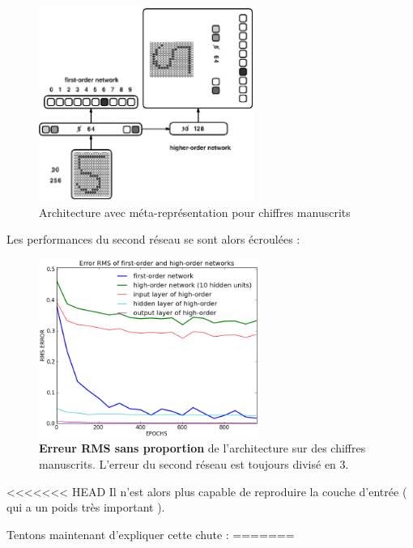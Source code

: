 \documentclass[a4paper,12pt, twoside]{article}
\begin{document}
\begin{figure}[H]
\begin{center}
 \includegraphics[height=240px]{../cleeremans_2007/digit_reco/schema_handwritten.png}
\end{center}
\caption{ Architecture avec méta-représentation pour chiffres manuscrits}
\end{figure}

Les performances du second réseau se sont alors écroulées : 
\begin{figure}[H]
\begin{center}
 \includegraphics[height=220px]{../cleeremans_2007/digit_reco/rms_handwritten_ffa.png}
\end{center}
\caption{ \textbf{Erreur RMS sans proportion} de l'architecture sur des chiffres manuscrits.
L'erreur du second réseau est toujours divisé en 3.}
\end{figure}

<<<<<<< HEAD
Il n'est alors plus capable de reproduire la couche d'entrée ( qui a un poids très important ).


Tentons maintenant d'expliquer cette chute :
=======
\end{document}
